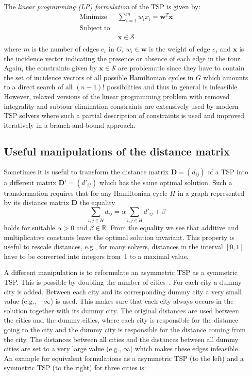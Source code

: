 \documentclass[10pt,a4paper,fleqn]{article}
\begin{document}
The \emph{linear programming (LP) formulation} of the TSP is given by:
\[
\begin{array}{rl}
    \text{Minimize }     & \sum_{i=1}^m{w_ix_i}  = \mathbf{w}^T\mathbf{x}\\[3mm] 
    \text{Subject to }   & \\
    & \mathbf{x} \in \mathcal{S} \\
\end{array}
\]
where $m$ is the number of edges $e_i$ in $G$, $w_i \in \mathbf{w}$ is the
weight of edge $e_i$ and $\mathbf{x}$ is the incidence vector indicating the
presence or absence of each edge in the tour. Again, the constraints given by
$\mathbf{x} \in \mathcal{S}$ are problematic since they have to contain the set
of incidence vectors of all possible Hamiltonian cycles in $G$ which amounts to
a direct search of all $(n-1)!$ possibilities and thus in general is
infeasible. However, relaxed versions of the linear programming problem with
removed integrality and subtour elimination constraints are extensively used by
modern TSP solvers where such a partial description of constraints is used and
improved iteratively in a branch-and-bound approach.

\subsection{Useful manipulations of the distance matrix}
\label{sec:manipulations}

Sometimes it is useful to transform the distance matrix $\mathbf{D} = (d_{ij})$
of a TSP into a different matrix $\mathbf{D'} = (d'_{ij})$ which has the same
optimal solution.  Such a transformation requires that for any
Hamiltonian cycle $H$ in a graph represented by its distance matrix $\mathbf{D}$
the equality
\begin{equation*}
\sum_{i,j \in H}{d_{ij}} = \alpha \sum_{i,j \in H}{d'_{ij}} + \beta
\end{equation*}
holds for suitable $\alpha > 0$ and $\beta \in \mathbb{R}$.  From the
equality we see that additive and multiplicative constants leave the
optimal solution invariant. This property is useful to rescale
distances, e.g., for many solvers, distances in the interval $[0, 1]$
have to be converted into integers from~1 to a maximal value.

A different manipulation is to reformulate an asymmetric TSP as a symmetric TSP.
This is possible by doubling the number of cities~\citep{Jonker1983}. For each
city a dummy city is added. Between each city and its corresponding dummy city
a very small value (e.g., $-\infty$) is used.  This makes sure that each
city always occurs in the solution together with its dummy city. The original
distances are used between the cities and the dummy cities, where each city is
responsible for the distance going to the city and the dummy city is
responsible for the distance coming from the city. The distances between all
cities and the distances between all dummy cities are set to a very large
value (e.g., $\infty$) which makes these edges infeasible. An example for
equivalent formulations as a asymmetric TSP (to the left) and
a symmetric TSP (to the right) for
three cities is:
\end{document}
